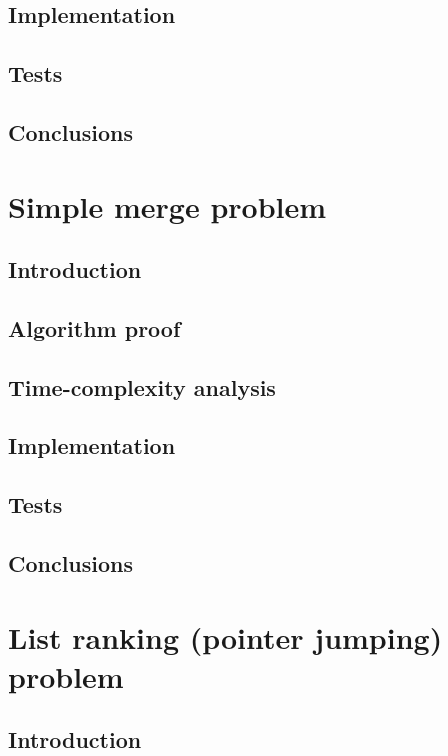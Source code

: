 \documentclass[a4paper,10pt,notitlepage]{article}
\begin{document}
\subsection{Implementation}

\subsection{Tests}

\subsection{Conclusions}


\section{Simple merge problem}

\subsection{Introduction}

\subsection{Algorithm proof}

\subsection{Time-complexity analysis}

\subsection{Implementation}

\subsection{Tests}

\subsection{Conclusions}


\section{List ranking (pointer jumping) problem}

\subsection{Introduction}
\end{document}
